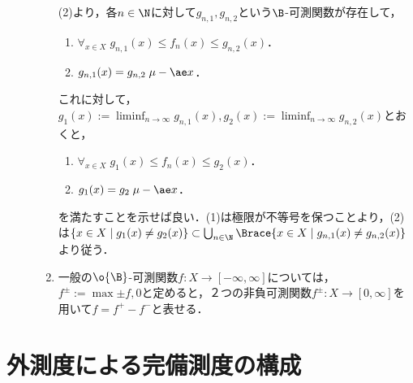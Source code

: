 \documentclass[uplatex, dvipdfmx]{jsreport}
\begin{document}
\begin{Proof}
\begin{description}
\begin{enumerate}
            (2)より，各$n\in\N$に対して$g_{n,1},g_{n,2}$という$\B$-可測関数が存在して，
            \begin{enumerate}
                \item $\forall_{x\in X}\;g_{n,1}(x)\le f_n(x)\le g_{n,2}(x)$．
                \item $g_{n,1}(x)=g_{n,2}\;\mu-\ae x$．
            \end{enumerate}
            これに対して，$g_1(x):=\liminf_{n\to\infty}g_{n,1}(x),g_2(x):=\liminf_{n\to\infty}g_{n,2}(x)$とおくと，
            \begin{enumerate}
                \item $\forall_{x\in X}\;g_{1}(x)\le f_n(x)\le g_{2}(x)$．
                \item $g_{1}(x)=g_{2}\;\mu-\ae x$．
            \end{enumerate}
            を満たすことを示せば良い．(1)は極限が不等号を保つことより，(2)は$\{x\in X\mid g_1(x)\ne g_2(x)\}\subset\bigcup_{n\in\N}\Brace{x\in X\mid g_{n,1}(x)\ne g_{n,2}(x)}$より従う．
            \item 一般の$\o{\B}$-可測関数$f:X\to[-\infty,\infty]$については，
            $f^{\pm}:=\max{\pm f,0}$と定めると，２つの非負可測関数$f^\pm:X\to[0,\infty]$を用いて$f=f^+-f^-$と表せる．
        \end{enumerate}
    \end{description}
\end{Proof}

\section{外測度による完備測度の構成}

    
\end{document}
